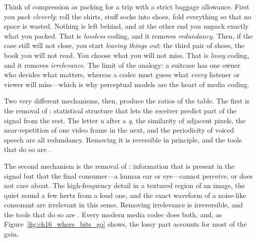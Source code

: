 \begin{analogy}
Think of compression as packing for a trip with a strict baggage allowance. First you
\emph{pack cleverly}: roll the shirts, stuff socks into shoes, fold everything so that no
space is wasted. Nothing is left behind, and at the other end you unpack exactly what you
packed. That is \emph{lossless} coding, and it removes \emph{redundancy}. Then, if the case still
will not close, you start \emph{leaving things out}: the third pair of shoes, the book you will
not read. You choose what you will not miss. That is \emph{lossy} coding, and it removes
\emph{irrelevance}. The limit of the analogy: a suitcase has one owner who decides what matters,
whereas a codec must guess what \emph{every} listener or viewer will miss---which is why
perceptual models are the heart of media coding.
\end{analogy}

Two very different mechanisms, then, produce the ratios of the table. The first is the removal
of : statistical structure that lets the receiver predict part of the signal from
the rest. The letter \emph{u} after a \emph{q}, the similarity of adjacent pixels, the
near-repetition of one video frame in the next, and the periodicity of voiced speech are all
redundancy. Removing it is reversible in principle, and the tools that do so are
.

The second mechanism is the removal of : information that is present in the
signal but that the final consumer---a human ear or eye---cannot perceive, or does not care about.
The high-frequency detail in a textured region of an image, the quiet sound a few hertz from a
loud one, and the exact waveform of a noise-like consonant are irrelevant in this sense. Removing
irrelevance is irreversible, and the tools that do so are . Every modern media codec
does both, and, as Figure~\ref{fig:ch16_where_bits_go} shows, the lossy part accounts for most of
the gain.


